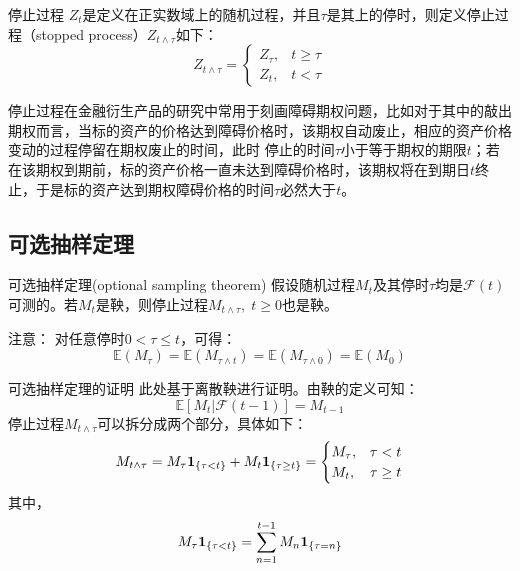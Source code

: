 \documentclass[t]{beamer}
\newcommand{\E}{\mathbb{E}}
\begin{document}
      \begin{frame}{停止过程}
        $Z_t$是定义在正实数域上的随机过程，并且$\tau$是其上的停时，则定义停止过程（stopped process）$Z_{t\wedge \tau}$如下：
\begin{equation*}
Z_{t\wedge \tau}=\begin{cases}
Z_{\tau},& t\ge \tau\\
Z_t,&t<\tau
\end{cases}
\end{equation*}

停止过程在金融衍生产品的研究中常用于刻画障碍期权问题，比如对于其中的敲出期权而言，当标的资产的价格达到障碍价格时，该期权自动废止，相应的资产价格变动的过程停留在期权废止的时间，此时
停止的时间$\tau$小于等于期权的期限$t$；若在该期权到期前，标的资产价格一直未达到障碍价格时，该期权将在到期日$t$终止，于是标的资产达到期权障碍价格的时间$\tau$必然大于$t$。
      \end{frame}

      \subsection{可选抽样定理}
      \begin{frame}{可选抽样定理(optional sampling theorem)}
        假设随机过程$M_{t}$及其停时$\tau$均是$\mathcal{F}(t)$可测的。若$M_{t}$是鞅，则停止过程$M_{t\wedge \tau},\; t\ge 0$也是鞅。

        \begin{block}{注意：}
          对任意停时$0<\tau\le t$，可得：
\begin{equation*}
\E\left(M_{\tau}\right)=
\E\left(M_{\tau\wedge t }\right)=\E\left(M_{\tau\wedge 0}\right)=\E(M_0)
\end{equation*}
        \end{block}
      \end{frame}






      \begin{frame}{可选抽样定理的证明}
        此处基于离散鞅进行证明。由鞅的定义可知：
        \[\E[M_{t}|\mathcal{F}({t-1})]=M_{t-1}\]
        停止过程$M_{t\wedge \tau}$可以拆分成两个部分，具体如下：
        \[
        M_{t\wedge \tau}=M_{\tau}{\bf 1}_{\{\tau<t\}}+M_{t}{\bf 1}_{\{\tau\ge t\}}=\begin{cases}
        M_{\tau},& \tau<t\\
        M_{t},&\tau\ge t
        \end{cases} \]
      其中，
      \[
        M_{\tau}{\bf 1}_{\{\tau<t\}}=\sum^{t-1}_{n=1}M_{n}{\bf 1}_{\{\tau=n\}}
       \]
       \end{frame}
\end{document}

